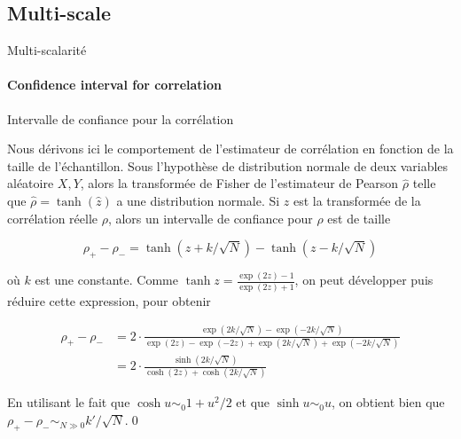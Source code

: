
%




\subsection{Multi-scale}{Multi-scalarité}



\paragraph{Confidence interval for correlation}{Intervalle de confiance pour la corrélation}

Nous dérivons ici le comportement de l'estimateur de corrélation en fonction de la taille de l'échantillon. Sous l'hypothèse de distribution normale de deux variables aléatoire $X,Y$, alors la transformée de Fisher de l'estimateur de Pearson $\hat{\rho}$ telle que $\hat{\rho} = \tanh (\hat{z})$ a une distribution normale. Si $z$ est la transformée de la corrélation réelle $\rho$, alors un intervalle de confiance pour $\rho$ est de taille

\[
\rho_{+} - \rho_{-} = \tanh (z + k / \sqrt{N}) - \tanh (z - k / \sqrt{N})
\]

où $k$ est une constante. Comme $\tanh{z} = \frac{\exp (2z) - 1}{\exp (2z) + 1}$, on peut développer puis réduire cette expression, pour obtenir

\[
\begin{split}
	\rho_{+} - \rho_{-} & = 2\cdot \frac{\exp (2k/\sqrt{N})-\exp (-2k/\sqrt{N})}{\exp (2z)-\exp (-2z) + \exp (2k/\sqrt{N}) + \exp (-2k/\sqrt{N})}\\
	& = 2\cdot \frac{\sinh{(2k/\sqrt{N})}}{\cosh{(2z)} + \cosh{(2k/\sqrt{N})}}
\end{split}
\]

En utilisant le fait que $\cosh u \sim_0 1 + u^2/2$ et que $\sinh u \sim_0 u$, on obtient bien que $\rho_{+} - \rho_{-} \sim_{N\gg 0} k' / \sqrt{N}$.\qed



\stars






